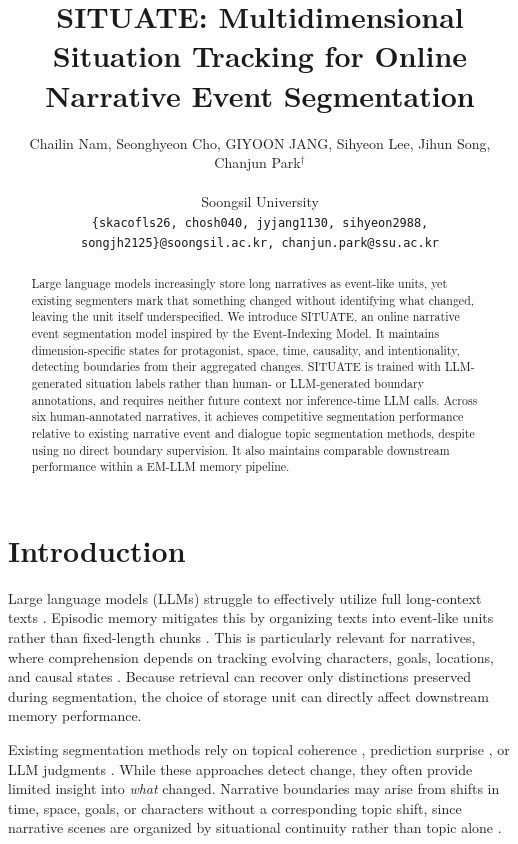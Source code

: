 \documentclass[11pt]{article}
\title{SITUATE: Multidimensional Situation Tracking for Online Narrative Event Segmentation}
\author{Chailin Nam, Seonghyeon Cho, GIYOON JANG, Sihyeon Lee, Jihun Song, Chanjun Park$^{\dagger}$
\\
\\Soongsil University
\\
   \texttt{\{skacofls26, chosh040, jyjang1130, sihyeon2988, songjh2125\}@soongsil.ac.kr, chanjun.park@ssu.ac.kr}
}
\begin{document}
\maketitle
\begin{abstract}
Large language models increasingly store long narratives as event-like units, yet existing segmenters mark that something changed without identifying what changed, leaving the unit itself underspecified. We introduce SITUATE, an online narrative event segmentation model inspired by the Event-Indexing Model. It maintains dimension-specific states for protagonist, space, time, causality, and intentionality, detecting boundaries from their aggregated changes. SITUATE is trained with LLM-generated situation labels rather than human- or LLM-generated boundary annotations, and requires neither future context nor inference-time LLM calls. Across six human-annotated narratives, it achieves competitive segmentation performance relative to existing narrative event and dialogue topic segmentation methods, despite using no direct boundary supervision. It also maintains comparable downstream performance within a EM-LLM memory pipeline.
\end{abstract}

\section{Introduction}
Large language models (LLMs) struggle to effectively utilize full long-context texts \citep{liu2024lost,li2024loogle}. Episodic memory mitigates this by organizing texts into event-like units rather than fixed-length chunks \citep{fountas2025human}. This is particularly relevant for narratives, where comprehension depends on tracking evolving characters, goals, locations, and causal states \citep{kim2024fables,jeong2025agent}. Because retrieval can recover only distinctions preserved during segmentation, the choice of storage unit can directly affect downstream memory performance.

Existing segmentation methods rely on topical coherence \citep{duarte2024lumberchunker}, prediction surprise \citep{kumar2023bayesian,fountas2025human}, or LLM judgments \citep{michelmann2025large,panela2025event}. While these approaches detect change, they often provide limited insight into \emph{what} changed. Narrative boundaries may arise from shifts in time, space, goals, or characters without a corresponding topic shift, since narrative scenes are organized by situational continuity rather than topic alone \citep{zehe2021detecting}.
\end{document}
